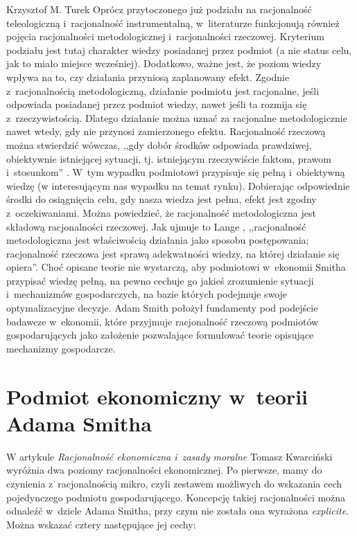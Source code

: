 \begin{artplenv}{Krzysztof M. Turek}
Oprócz przytoczonego już podziału na racjonalność teleologiczną i~racjonalność instrumentalną, w~literaturze funkcjonują
również pojęcia racjonalności metodologicznej i~racjonalności rzeczowej. Kryterium podziału jest tutaj charakter wiedzy
posiadanej przez podmiot (a nie status celu, jak to miało miejsce wcześniej). Dodatkowo, ważne jest, że poziom wiedzy
wpływa na to, czy działania przyniosą zaplanowany efekt. Zgodnie z~racjonalnością metodologiczną, działanie podmiotu
jest racjonalne, jeśli odpowiada posiadanej przez podmiot wiedzy, nawet jeśli ta rozmija się z~rzeczywistością. Dlatego
działanie można uznać za racjonalne metodologicznie nawet wtedy, gdy nie przynosi zamierzonego efektu. Racjonalność
rzeczową można stwierdzić wówczas, ,,gdy dobór środków odpowiada prawdziwej, obiektywnie istniejącej sytuacji, tj.
istniejącym rzeczywiście faktom, prawom i~stosunkom''
\parencite[s.~140]{lange_ekonomia_1978}.
W~tym wypadku
podmiotowi przypisuje się pełną i~obiektywną wiedzę (w interesującym nas wypadku na temat rynku). Dobierając
odpowiednie środki do osiągnięcia celu, gdy nasza wiedza jest pełna, efekt jest zgodny z~oczekiwaniami. Można
powiedzieć, że racjonalność metodologiczna jest składową racjonalności rzeczowej. Jak ujmuje to Lange
\parencite*[s.~140]{lange_ekonomia_1978},
,,racjonalność metodologiczna jest właściwością działania jako sposobu
postępowania; racjonalność rzeczowa jest sprawą adekwatności wiedzy, na której działanie się opiera''. Choć opisane
teorie nie wystarczą, aby podmiotowi w~ekonomii Smitha przypisać\textit{ }wiedzę pełną, na pewno cechuje go jakieś
zrozumienie sytuacji i~mechanizmów gospodarczych, na bazie których podejmuje swoje optymalizacyjne decyzje. Adam Smith
położył fundamenty pod podejście badawcze w~ekonomii, które przyjmuje racjonalność rzeczową podmiotów gospodarujących
jako założenie pozwalające formułować teorie opisujące mechanizmy gospodarcze.

\section{Podmiot ekonomiczny w~teorii Adama Smitha}

W artykule \textit{Racjonalność ekonomiczna i~zasady moralne} Tomasz Kwarciński
\parencite*{klosinski_racjonalnosc_2009}
wyróżnia
dwa poziomy racjonalności ekonomicznej. Po pierwsze, mamy do czynienia z~racjonalnością mikro, czyli zestawem możliwych
do wskazania cech pojedynczego podmiotu gospodarującego. Koncepcję takiej racjonalności można odnaleźć w~dziele Adama
Smitha, przy czym nie została ona wyrażona \textit{explicite}. Można wskazać cztery następujące jej cechy:


\end{artplenv}
